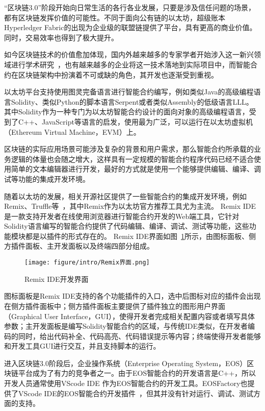“区块链3.0”阶段开始向日常生活的各行各业发展，只要是涉及信任问题的场景，都有区块链发挥价值的可能性。不同于面向公有链的以太坊，超级账本Hyperledger Fabric的出现为企业级的联盟链提供了平台，具有更高的商业价值。同时，交易效率也得到了极大提升。

如今区块链技术的价值愈加体现，国内外越来越多的专家学者开始涉入这一新兴领域进行学术研究~\cite{张荣2017, 陈旭2017}，也有越来越多的企业将这一技术落地到实际项目中，而智能合约在区块链架构中扮演着不可或缺的角色，其开发也逐渐受到重视。

以太坊平台支持使用图灵完备语言进行智能合约编写，例如类似Java的高级编程语言Solidity、类似Python的脚本语言Serpent或者类似Assembly的低级语言LLL。
其中Solidity作为一种专门为以太坊智能合约设计的面向对象的高级编程语言，受到了C++、JavaScript等语言的启发，使用最为广泛，可以运行在以太坊虚拟机（Ethereum Virtual Machine，EVM）上。

区块链的实际应用场景可能涉及复杂的背景和用户需求，那么智能合约所承载的业务逻辑的体量也会随之增大，这样具有一定规模的智能合约程序代码已经不适合使用简单的文本编辑器进行开发，最好的方式就是使用一个能够提供编辑、编译、调试等功能的集成开发环境。

随着以太坊的发展，相关开源社区提供了一些智能合约的集成开发环境，例如Remix、Truffle等~\cite{QianYang}，其中Remix作为以太坊官方推荐工具尤为主流。
Remix IDE是一款支持开发者在线使用浏览器进行智能合约开发的Web端工具，它针对Solidity语言编写的智能合约提供了代码编辑、编译、调试、测试等功能，这些功能模块都是以插件的形式存在的。
Remix IDE界面如图~\ref{fig:1.2}所示，由图标面板、侧方插件面板、主开发面板以及终端四部分组成。

\begin{figure}[htb]
  \centering
  \texttt{[image: figure/intro/Remix界面.png]}
  \caption{Remix IDE开发界面}\label{fig:1.2}
\end{figure}

图标面板是Remix IDE支持的各个功能插件的入口，选中后图标对应的插件会出现在侧方插件面板中；侧方插件面板主要提供了插件独立的图形用户界面（Graphical User Interface，GUI），使得开发者完成相关配置内容或者填写具体参数；主开发面板是编写Solidity智能合约的区域，与传统IDE类似，在开发者编码的同时，给出代码补全、代码高亮、代码错误提示等内容；终端使得开发者能够和开发工具GUI进行交互，并且支持脚本的运行。

进入区块链3.0阶段后，企业操作系统（Enterprise Operating System，EOS）区块链平台成为了有力的竞争者之一。由于EOS智能合约的开发语言是C++，所以开发人员通常使用VScode IDE 作为EOS智能合约的开发工具。EOSFactory也提供了VScode IDE的EOS智能合约开发插件~\cite{罗雄2020}，但其并没有针对运行、调试、测试方面的支持。


